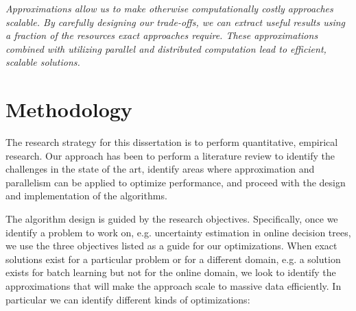 \begin{displayquote}
	\emph{Approximations allow us to make otherwise computationally costly approaches scalable.
	By carefully designing our trade-offs, we can extract useful results using a fraction
	of the resources exact approaches require. These approximations combined with utilizing parallel and distributed computation lead to efficient, scalable solutions.}
\end{displayquote}

\section{Methodology}

The research strategy for this dissertation is to perform quantitative, empirical research.
Our approach has been to perform a literature review to identify the challenges in the
state of the art, identify areas where approximation and parallelism can be applied to
optimize performance, and proceed with the design and implementation of the algorithms.

The algorithm design is guided by the research objectives. Specifically, once we identify a problem
to work on, e.g. uncertainty estimation in online decision trees, we use the three objectives
listed as a guide for our optimizations. When exact solutions exist for a particular problem
or for a different domain, e.g. a solution exists for batch learning but not for the online
domain, we look to identify the approximations that will make the approach scale to massive
data efficiently. In particular we can identify different kinds of optimizations:

